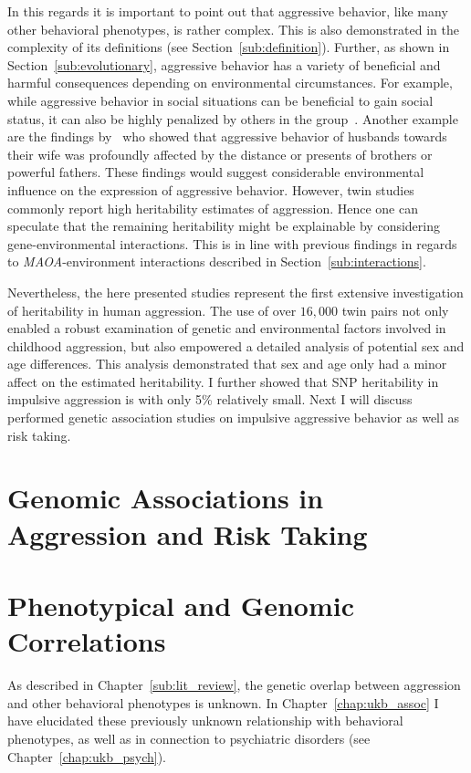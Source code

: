 In this regards it is important to point out that aggressive behavior, like many other behavioral phenotypes, is rather complex.
This is also demonstrated in the complexity of its definitions (see Section~\ref{sub:definition}).
Further, as shown in Section~\ref{sub:evolutionary}, aggressive behavior has a variety of beneficial and harmful consequences depending on environmental circumstances. 
For example, while aggressive behavior in social situations can be beneficial to gain social status, it can also be highly penalized by others in the group~\cite{Buss1997}.
Another example are the findings by~\citet{Figueredo1995} who showed that aggressive behavior of husbands towards their wife was profoundly affected by the distance or presents of brothers or powerful fathers.
These findings would suggest considerable environmental influence on the expression of aggressive behavior.
However, twin studies commonly report high heritability estimates of aggression.
Hence one can speculate that the remaining heritability might be explainable by considering gene-environmental interactions.
This is in line with previous findings in regards to \textit{MAOA}-environment interactions described in Section~\ref{sub:interactions}.

Nevertheless, the here presented studies represent the first extensive investigation of heritability in human aggression.
The use of over $16,000$ twin pairs not only enabled a robust examination of genetic and environmental factors involved in childhood aggression, but also empowered a detailed analysis of potential sex and age differences.
This analysis demonstrated that sex and age only had a minor affect on the estimated heritability.
I further showed that SNP heritability in impulsive aggression is with only 5\% relatively small.
Next I will discuss performed genetic association studies on impulsive aggressive behavior as well as risk taking. 

\section{Genomic Associations in Aggression and Risk Taking}
\label{sec:genomic_associations_in_aggression_and_risk_taking}

\section{Phenotypical and Genomic Correlations}
\label{sec:phenotypical_and_genomic_correlations}

As described in Chapter~\ref{sub:lit_review}, the genetic overlap between aggression and other behavioral phenotypes is unknown.
In Chapter~\ref{chap:ukb_assoc} I have elucidated these previously unknown relationship with behavioral phenotypes, as well as in connection to psychiatric disorders (see Chapter~\ref{chap:ukb_psych}).

